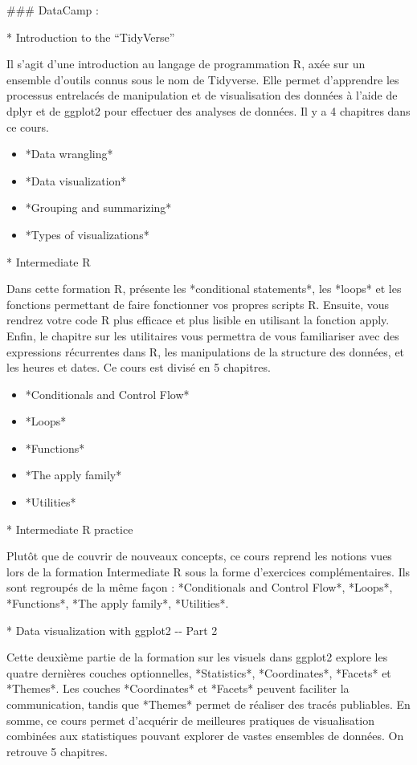 \documentclass[
  letterpaper,
]{scrbook}
\begin{document}
\#\#\# DataCamp :

* Introduction to the ``TidyVerse''

Il s'agit d'une introduction au langage de programmation R, axée sur un
ensemble d'outils connus sous le nom de Tidyverse. Elle permet
d'apprendre les processus entrelacés de manipulation et de visualisation
des données à l'aide de dplyr et de ggplot2 pour effectuer des analyses
de données. Il y a 4 chapitres dans ce cours.

\begin{itemize}
\item
  *Data wrangling*
\item
  *Data visualization*
\item
  *Grouping and summarizing*
\item
  *Types of visualizations*
\end{itemize}

* Intermediate R

Dans cette formation R, présente les *conditional statements*, les
*loops* et les fonctions permettant de faire fonctionner vos propres
scripts R. Ensuite, vous rendrez votre code R plus efficace et plus
lisible en utilisant la fonction apply. Enfin, le chapitre sur les
utilitaires vous permettra de vous familiariser avec des expressions
récurrentes dans R, les manipulations de la structure des données, et
les heures et dates. Ce cours est divisé en 5 chapitres.

\begin{itemize}
\item
  *Conditionals and Control Flow*
\item
  *Loops*
\item
  *Functions*
\item
  *The apply family*
\item
  *Utilities*
\end{itemize}

* Intermediate R practice

Plutôt que de couvrir de nouveaux concepts, ce cours reprend les notions
vues lors de la formation Intermediate R sous la forme d'exercices
complémentaires. Ils sont regroupés de la même façon : *Conditionals and
Control Flow*, *Loops*, *Functions*, *The apply family*, *Utilities*.

* Data visualization with ggplot2 -\/- Part 2

Cette deuxième partie de la formation sur les visuels dans ggplot2
explore les quatre dernières couches optionnelles, *Statistics*,
*Coordinates*, *Facets* et *Themes*. Les couches *Coordinates* et
*Facets* peuvent faciliter la communication, tandis que *Themes* permet
de réaliser des tracés publiables. En somme, ce cours permet d'acquérir
de meilleures pratiques de visualisation combinées aux statistiques
pouvant explorer de vastes ensembles de données. On retrouve 5
chapitres.
\end{document}
